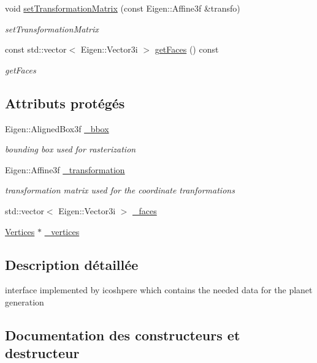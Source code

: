 \begin{DoxyCompactItemize}
void \hyperlink{class_shape_a04294d1d80623bb8c5a7d4037549fa27}{set\+Transformation\+Matrix} (const Eigen\+::\+Affine3f \&transfo)
\begin{DoxyCompactList}\small\item\em set\+Transformation\+Matrix \end{DoxyCompactList}\item 
const std\+::vector$<$ Eigen\+::\+Vector3i $>$ \hyperlink{class_shape_aeeb67de72adb9667c1eb48129f3e5ffb}{get\+Faces} () const
\begin{DoxyCompactList}\small\item\em get\+Faces \end{DoxyCompactList}\end{DoxyCompactItemize}
\subsection*{Attributs protégés}
\begin{DoxyCompactItemize}
\item 
Eigen\+::\+Aligned\+Box3f \hyperlink{class_shape_aa2399d2b2884c25ebc2e8f87584cc529}{\+\_\+bbox}
\begin{DoxyCompactList}\small\item\em bounding box used for rasterization \end{DoxyCompactList}\item 
Eigen\+::\+Affine3f \hyperlink{class_shape_a67c0ffb0290a2a1ff5e602c324130332}{\+\_\+transformation}
\begin{DoxyCompactList}\small\item\em transformation matrix used for the coordinate tranformations \end{DoxyCompactList}\item 
std\+::vector$<$ Eigen\+::\+Vector3i $>$ \hyperlink{class_shape_abb07b26e344946f745964c019a2c598e}{\+\_\+faces}
\item 
\hyperlink{struct_shape_1_1_vertices}{Vertices} $\ast$ \hyperlink{class_shape_ac2f7f1148a34325d99be6d983fcf9bb0}{\+\_\+vertices}
\end{DoxyCompactItemize}


\subsection{Description détaillée}
interface implemented by icoshpere which contains the needed data for the planet generation 

\subsection{Documentation des constructeurs et destructeur}
\mbox{\label{class_shape_aaa8d87171e65e0d8ba3c5459978992a7}} 
